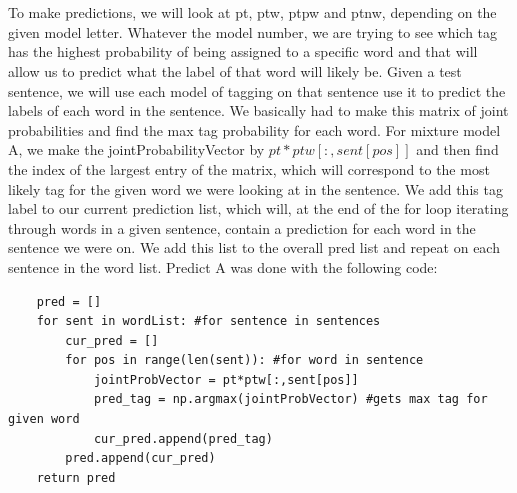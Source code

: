 \documentclass{article}
\begin{document}
\section{}
To make predictions, we will look at pt, ptw, ptpw and ptnw, depending on the given model letter.  Whatever the model number, we are trying to see which tag has the highest probability of being assigned to a specific word and that will allow us to predict what the label of that word will likely be.  Given a test sentence, we will use each model of tagging on that sentence use it to predict the labels of each word in the sentence.  We basically had to make this matrix of joint probabilities and find the max tag probability for each word.  For mixture model A, we make the jointProbabilityVector by $pt*ptw[:,sent[pos]]$ and then find the index of the largest entry of the matrix, which will correspond to the most likely tag for the given word we were looking at in the sentence.  We add this tag label to our current prediction list, which will, at the end of the for loop iterating through words in a given sentence, contain a prediction for each word in the sentence we were on.  We add this list to the overall pred list and repeat on each sentence in the word list.  Predict A was done with the following code: 
\begin{verbatim}
	pred = []
	for sent in wordList: #for sentence in sentences
		cur_pred = []
		for pos in range(len(sent)): #for word in sentence
			jointProbVector = pt*ptw[:,sent[pos]]                                         
            pred_tag = np.argmax(jointProbVector) #gets max tag for given word
			cur_pred.append(pred_tag)
		pred.append(cur_pred)
	return pred\end{verbatim}
\end{document}
